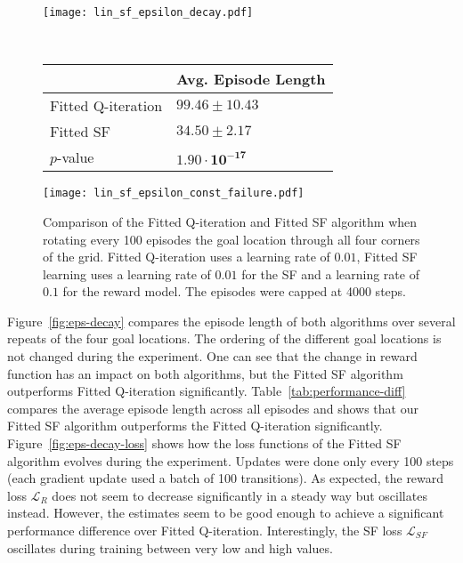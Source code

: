 \documentclass{article}
\begin{document}
\begin{figure*}
\centering
\begin{minipage}{.62\textwidth}
\centering
\texttt{[image: lin\_sf\_epsilon\_decay.pdf]}
\vspace{-1.05cm}
\caption{Comparison of the Fitted Q-iteration and Fitted SF algorithm when rotating every 100 episodes the goal location through all four corners of the grid. Fitted Q-iteration uses a learning rate of $0.01$, Fitted SF learning uses a learning rate of $0.01$ for the SF and a learning rate of $0.1$ for the reward model. The episodes were capped at 4000 steps.}
\label{fig:eps-decay}
\end{minipage}~
\begin{minipage}{.38\textwidth}
\begin{tabular}{| p{2.5cm} | l |}
\hline
                             & Avg. Episode Length \\
\hline
 Fitted Q-iteration & $99.46 \pm 10.43$ \\
 \hline
 Fitted SF             & $34.50 \pm 2.17$  \\
 \hline
 \hline
$p$-value & $\mathbf{1.90 \cdot 10^{-17}}$ \\
 \hline
\end{tabular}
\label{tab:performance-diff}

\centering
\texttt{[image: lin\_sf\_epsilon\_const\_failure.pdf]}
\vspace{-.7cm}
\label{fig:failure-case}

\end{minipage}
\end{figure*}

Figure~\ref{fig:eps-decay} compares the episode length of both algorithms over several repeats of the four goal locations. 
The ordering of the different goal locations is not changed during the experiment. 
One can see that the change in reward function has an impact on both algorithms, but the Fitted SF algorithm outperforms Fitted Q-iteration significantly.
Table~\ref{tab:performance-diff} compares the average episode length across all episodes and shows that our Fitted SF algorithm outperforms the Fitted Q-iteration significantly.
%
Figure~\ref{fig:eps-decay-loss} shows how the loss functions of the Fitted SF algorithm evolves during the experiment. 
Updates were done only every 100 steps (each gradient update used a batch of 100 transitions).
As expected, the reward loss $\mathcal{L}_R$ does not seem to decrease significantly in a steady way but oscillates instead.
However, the estimates seem to be good enough to achieve a significant performance difference over Fitted Q-iteration.
Interestingly, the SF loss $\mathcal{L}_{SF}$ oscillates during training between very low and high values. 
\end{document}
